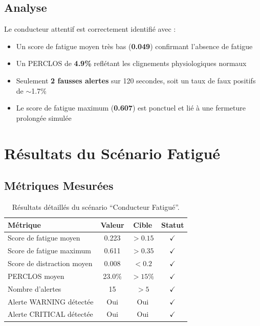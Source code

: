 \documentclass[12pt,a4paper,twoside]{report}
\begin{document}
\subsection{Analyse}

Le conducteur attentif est correctement identifié avec :
\begin{itemize}
    \item Un score de fatigue moyen très bas (\textbf{0.049}) confirmant l'absence de fatigue
    \item Un PERCLOS de \textbf{4.9\%} reflétant les clignements physiologiques normaux
    \item Seulement \textbf{2 fausses alertes} sur 120 secondes, soit un taux de faux positifs de $\sim$1.7\%
    \item Le score de fatigue maximum (\textbf{0.607}) est ponctuel et lié à une fermeture prolongée simulée
\end{itemize}

\section{Résultats du Scénario Fatigué}

\subsection{Métriques Mesurées}

\begin{table}[H]
\centering
\caption{Résultats détaillés du scénario ``Conducteur Fatigué''.}
\label{tab:results_fatigue}
\renewcommand{\arraystretch}{1.3}
\begin{tabular}{|l|c|c|c|}
\hline
\rowcolor{alertorange!20}
\textbf{Métrique} & \textbf{Valeur} & \textbf{Cible} & \textbf{Statut} \\
\hline
Score de fatigue moyen & 0.223 & $> 0.15$ & $\checkmark$ \\
\hline
Score de fatigue maximum & 0.611 & $> 0.35$ & $\checkmark$ \\
\hline
Score de distraction moyen & 0.008 & $< 0.2$ & $\checkmark$ \\
\hline
PERCLOS moyen & 23.0\% & $> 15\%$ & $\checkmark$ \\
\hline
Nombre d'alertes & 15 & $> 5$ & $\checkmark$ \\
\hline
Alerte WARNING détectée & Oui & Oui & $\checkmark$ \\
\hline
Alerte CRITICAL détectée & Oui & Oui & $\checkmark$ \\
\hline
\end{tabular}
\end{table}
\end{document}
